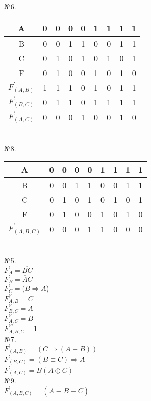 \documentclass[a4paper,12pt]{report} %
\begin{document}
\begin{multicols}{2}
№6.\\
\bigskip
\begin{tabular}{|c|c|c|c|c|c|c|c|c|}
\hline
A &0 &0 &0 &0 &1 &1 &1 &1 \\
\hline
B &0 &0 &1 &1 &0 &0 &1 &1 \\
\hline
C &0 &1 &0 &1 &0 &1 &0 &1 \\
\hline
F &0 & 1 & 0 & 0 & 1 &0&1&0 \\
\hline
$F_{(A,B)}^{\prime}$ & 1&1&1&0&1&0&1&1\\
\hline
$F_{(B,C)}^{\prime}$ & 0&1&1&0&1&1&1&1\\
\hline
$F_{(A,C)}^{\prime}$ & 0&0&0&1&0&0&1&0\\
\hline
\end{tabular}
\\
\bigskip
№8.\\
\bigskip
\begin{tabular}{|c|c|c|c|c|c|c|c|c|}
\hline
A &0 &0 &0 &0 &1 &1 &1 &1 \\
\hline
B &0 &0 &1 &1 &0 &0 &1 &1 \\
\hline
C &0 &1 &0 &1 &0 &1 &0 &1 \\
\hline
F &0 & 1 & 0 & 0 & 1 & 0 & 1 & 0 \\
\hline
$F_{(A,B,C)}^{\prime}$ & 0&0&0&1&1&0&0&0\\
\hline
\end{tabular}\\
\bigskip
\columnbreak
№5. \\
\bigskip
$ F_A^{\prime} = \overline{BC} $ \\
$ F_B^{\prime} = \overline{A}C $ \\
$ F_C^{\prime} = (B \Rightarrow A $) \\
$ F_{A,B}^{\prime\prime} =  C$ \\
$ F_{B,C}^{\prime\prime} =  \overline{A}$ \\
$ F_{A,C}^{\prime\prime} =  B$ \\
$ F_{A,B,C}^{\prime\prime\prime} = 1 $ \\
\bigskip
\bigskip
№7. \\
\bigskip
$ F_{(A,B)}^{\prime} =  (C \Rightarrow (A \equiv B))$ \\
$ F_{(B,C)}^{\prime} =  (B \equiv C) \Rightarrow A$ \\
$ F_{(A,C)}^{\prime} = B(A \oplus C)$ \\
\bigskip
\bigskip
№9. \\
\bigskip
$ F_{(A,B,C)}^{\prime} = (\overline{A} \equiv B \equiv C) $ \\
\end{multicols}
\end{document}
